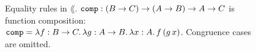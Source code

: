 \begin{figure}
\caption{Equality rules in $\lang$. $\mathtt{comp} : (B \to C) \to (A \to B) \to A \to C$ is function composition: $\mathtt{comp} = \lambda f : B \to C.\,\lambda g : A \to B.\,\lambda x : A.\,f\, (g\, x)$. Congruence cases are omitted.}
\label{fig:logic-equalities}
\end{figure}
